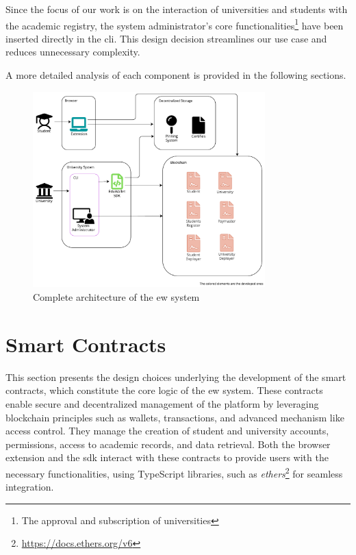 Since the focus of our work is on the interaction of universities and students with the academic registry, the system administrator's core functionalities\footnote{The approval and subscription of universities} have been inserted directly in the \acrshort{cli}. This design decision streamlines our use case and reduces unnecessary complexity.

A more detailed analysis of each component is provided in the following sections.

\begin{figure}[htpb]
  \centering
  \includegraphics[width=0.8\textwidth]{figures/Architecture diagram complete.pdf}
  \caption[System architecture diagram]{Complete architecture of the \acrlong{ew} system}
  \label{fig:fullArchDiag}
\end{figure}

\section{Smart Contracts}
\label{sec:smartContractsDesign}
This section presents the design choices underlying the development of the smart contracts, which constitute the core logic of the \acrshort{ew} system. These contracts enable secure and decentralized management of the platform by leveraging blockchain principles such as wallets, transactions, and advanced mechanism like access control. They manage the creation of student and university accounts, permissions, access to academic records, and data retrieval. Both the browser extension and the \acrshort{sdk} interact with these contracts to provide users with the necessary functionalities, using TypeScript libraries, such as \textit{ethers}\footnote{\url{https://docs.ethers.org/v6}} for seamless integration.

